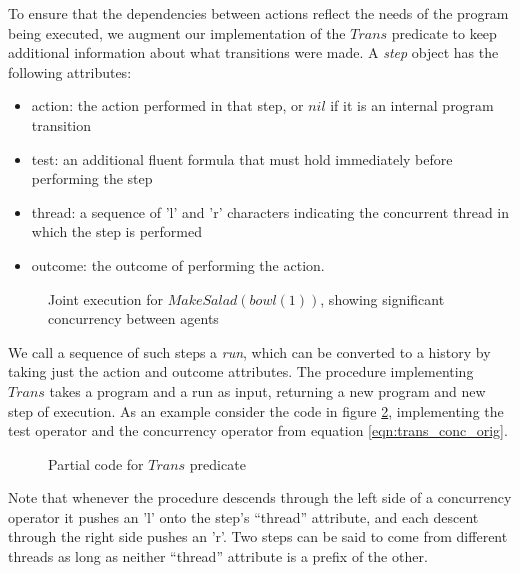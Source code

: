 To ensure that the dependencies between actions reflect the needs
of the program being executed, we augment our implementation of the
$Trans$ predicate to keep additional information about what transitions
were made. A \emph{step} object has the following attributes:

\begin{itemize}
\item action: the action performed in that step, or $nil$ if it is an internal
program transition 
\item test: an additional fluent formula that must hold immediately before
performing the step 
\item thread: a sequence of 'l' and 'r' characters indicating the concurrent
thread in which the step is performed 
\item outcome: the outcome of performing the action. 
\end{itemize}
%
\begin{figure}

\caption{ Joint execution for $MakeSalad(bowl(1))$, showing significant concurrency
between agents }


\label{fig:plan-output} 
\end{figure}


We call a sequence of such steps a \emph{run}, which can be converted
to a history by taking just the action and outcome attributes. The
procedure implementing $Trans$ takes a program and a run as input,
returning a new program and new step of execution. As an example consider
the code in figure \ref{fig:trans-code}, implementing the test operator
and the concurrency operator from equation \ref{eqn:trans_conc_orig}.

%
\begin{figure}

\caption{Partial code for $Trans$ predicate}


\label{fig:trans-code} 
\end{figure}


Note that whenever the procedure descends through the left side of
a concurrency operator it pushes an 'l' onto the step's {}``thread''
attribute, and each descent through the right side pushes an 'r'.
Two steps can be said to come from different threads as long as neither
{}``thread'' attribute is a prefix of the other.

